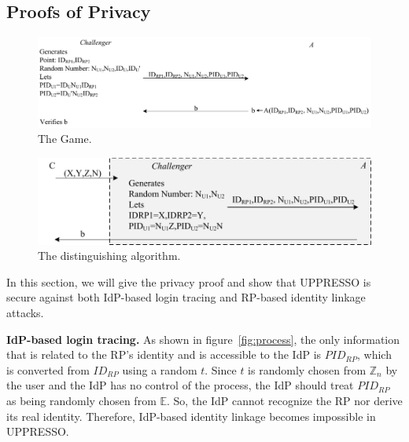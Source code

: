 


\subsection{Proofs of Privacy}
\label{sec:analysis}
\begin{figure}
  \centering
  \includegraphics[width=0.82\linewidth]{fig/game1.pdf}
  \caption{The Game.}
  \label{fig:game}
\end{figure}

\begin{figure}
  \centering
  \includegraphics[width=0.65\linewidth]{fig/dalgorithm.pdf}
  \caption{The distinguishing algorithm.}
  \label{fig:dalgorithm}
\end{figure}
In this section, we will give the privacy proof and show that UPPRESSO is secure against both IdP-based login tracing and RP-based identity linkage attacks.

\noindent\textbf{IdP-based login tracing.}
As shown in figure~\ref{fig:process}, the only information that is related to the RP's identity and is accessible to the IdP is $PID_{RP}$,
 which is converted from $ID_{RP}$ using a random $t$.
Since $t$ is randomly chosen from $\mathbb{Z}_n$ by the user
 and the IdP has no control of the process,
 the IdP should treat $PID_{RP}$ as being randomly chosen from $\mathbb{E}$.
So, the IdP cannot recognize the RP nor derive its real identity. Therefore, IdP-based identity linkage becomes impossible in UPPRESSO.

